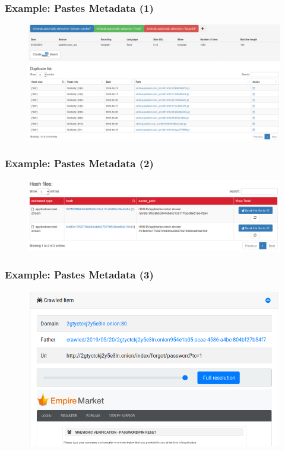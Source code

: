 \documentclass{beamer}
\begin{document}
\begin{frame}
    \frametitle{Example: Pastes Metadata (1)}
    \begin{figure}
        \includegraphics[scale=0.21, angle=0]{images/ail_15.png}
    \end{figure}
\end{frame}

\begin{frame}
    \frametitle{Example: Pastes Metadata (2)}
    \begin{figure}
        \includegraphics[scale=0.28, angle=0]{images/ail_16.png}
    \end{figure}
\end{frame}

\begin{frame}
    \frametitle{Example: Pastes Metadata (3)}
    \begin{figure}
        \includegraphics[scale=0.28, angle=0]{images/ail_17.png}
    \end{figure}
\end{frame}
\end{document}
